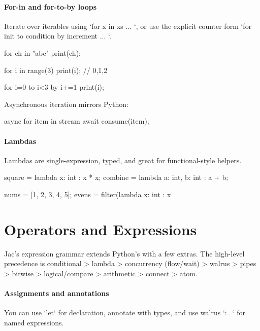 \paragraph{For-in and for-to-by loops}

Iterate over iterables using `for x in xs { ... }`, or use the explicit counter form `for init to condition by increment { ... }`.

\begin{jacblock}
for ch in "abc" { print(ch); }

for i in range(3) {
    print(i);  // 0,1,2
}

for i=0 to i<3 by i+=1 {
    print(i);
}
\end{jacblock}

Asynchronous iteration mirrors Python:

\begin{jacblock}
async for item in stream {
    await consume(item);
}
\end{jacblock}

\paragraph{Lambdas}

Lambdas are single-expression, typed, and great for functional-style helpers.

\begin{jacblock}
square = lambda x: int : x * x;
combine = lambda a: int, b: int : a + b;

nums = [1, 2, 3, 4, 5];
evens = filter(lambda x: int : x %
\end{jacblock}

\section{Operators and Expressions}

Jac's expression grammar extends Python's with a few extras. The high-level precedence is conditional > lambda > concurrency (flow/wait) > walrus > pipes > bitwise > logical/compare > arithmetic > connect > atom.

\paragraph{Assignments and annotations}

You can use `let` for declaration, annotate with types, and use walrus `:=` for named expressions.

